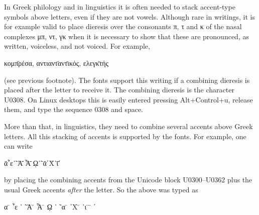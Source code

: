 \documentclass{article}
\begin{document}
In Greek philology and in linguistics it is often needed to stack accent-type symbols above letters,
even if they are not vowels. Although rare in writings, it is for example valid to place dieresis
over the consonants π, τ and κ of the nasal complexes μπ, ντ, γκ
when it is necessary to show that these are pronounced, as written, voiceless, and not voiced.
For example,
\begin{center}
κομπ̈ρέσα, \quad αντιαντ̈αντ̈ικός, \quad ελεγκ̈τής
\end{center}
(see previous footnote). The fonts support this writing if a combining dieresis is placed after
the letter to receive it. The combining dieresis is the character U0308. On Linux desktops this is
easily entered pressing Alt+Control+u, release them, and type the sequence 0308 and space.

More than that, in linguistics, they need to combine several accents above Greek letters. All this
stacking of accents is supported by the fonts. For example, one can write
\begin{center}
ᾱ῏\quad ε᾿῀\quad Ἀ̆ \quad Ἆ̄ \quad ῼ᾿῀\quad ᾱ΄\quad Χ̆᾿\quad ῑ̈΄
\end{center}
by placing the combining accents from the Unicode block U0300--U0362 plus the usual Greek accents
\textit{after} the letter.
So the above was typed as
\begin{center}
{\ttfamily α ̄\hspace*{-5pt} ῏\qquad ε\hspace*{-5pt} ᾿ ῀\qquad Ἀ ̆ \quad Ἆ ̄ \qquad ῼ\hspace*{-5pt} ᾿ ῀\qquad α ̄\hspace*{-5pt} ΄\qquad Χ ̆\hspace*{-5pt} ᾿\qquad ι ̄ ̈\hspace*{-5pt} ΄}
\end{center}
\end{document}
